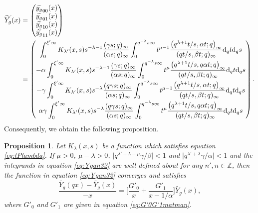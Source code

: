 \documentclass[pdftex]{sigma}
\numberwithin{equation}{section}
\newtheorem{Proposition}[Theorem]{Proposition}
\theoremstyle{definition}
\begin{document}
\begin{align}
 \widetilde{Y_g}(x)
&=\begin{pmatrix}
 \widetilde{y_g}_{00}(x) \\
 \widetilde{y_g}_{01}(x) \\
 \widetilde{y_g}_{10}(x) \\
 \widetilde{y_g}_{11}(x)
 \end{pmatrix}
\nonumber \\
&= \begin{pmatrix}
 \displaystyle \int_0^{\xi' \infty} K_{\lambda'}(x,s) s^{-\lambda -1} \frac{(\gamma s; q)_{\infty}}{(\alpha s; q)_{\infty}} \int_0^{q^{-\lambda } s \infty} t^{\mu -1} \frac{\bigl(q^{\lambda+1}t/s , \alpha t ;q\bigr)_{\infty}}{(qt/s , \beta t ;q)_{\infty}} {\rm d}_q t {\rm d}_q s \vspace{1mm}\\
 \displaystyle - \alpha \int_0^{\xi' \infty} K_{\lambda'}(x,s) s^{-\lambda -1} \frac{(\gamma s; q)_{\infty}}{(\alpha s; q)_{\infty}} \int_0^{q^{-\lambda } s \infty} t^{\mu} \frac{\bigl(q^{\lambda+1}t/s , q \alpha t ;q\bigr)_{\infty}}{(qt/s , \beta t ;q)_{\infty}} {\rm d}_q t {\rm d}_q s \vspace{1mm}\\
 \displaystyle -\gamma \int_0^{\xi' \infty} K_{\lambda'}(x,s) s^{-\lambda } \frac{(q \gamma s; q)_{\infty}}{(\alpha s; q)_{\infty}} \int_0^{q^{-\lambda } s \infty} t^{\mu -1} \frac{\bigl(q^{\lambda+1}t/s , \alpha t ;q\bigr)_{\infty}}{(qt/s , \beta t ;q)_{\infty}} {\rm d}_q t {\rm d}_q s \vspace{1mm}\\
 \displaystyle \alpha \gamma \int_0^{\xi' \infty} K_{\lambda'}(x,s) s^{-\lambda } \frac{(q \gamma s; q)_{\infty}}{(\alpha s; q)_{\infty}} \int_0^{q^{-\lambda } s \infty} t^{\mu} \frac{\bigl(q^{\lambda+1}t/s , q \alpha t ;q\bigr)_{\infty}}{(qt/s , \beta t ;q)_{\infty}} {\rm d}_q t {\rm d}_q s
 \end{pmatrix}.  \label{eq:Ygan32}
\end{align}
Consequently, we obtain the following proposition.
\begin{Proposition}
Let $K_{\lambda }(x,s)$ be a function which satisfies equation \eqref{eq:tPlambda}.
If $\mu >0$, $\mu - \lambda >0 $, $\big|q^{\lambda ' + \lambda -\mu } \gamma / \beta \big| <1 $ and $ \big|q^{\lambda ' +\lambda } \gamma / \alpha \big| <1 $ and the integrands in equation \eqref{eq:Ygan32} are well defined about  for any $n', n \in \mathbb{Z} $, then the function  in equation \eqref{eq:Ygan32} converges and satisfies
\begin{equation} \label{eq:G'0G'1man}
\frac{\widetilde{Y_g}(qx) - \widetilde{Y_g}(x)}{-x} = \bigg[ \frac{G'_0}{x} + \frac{G'_1}{x-1/\alpha} \bigg] \widetilde{Y_g}(x),
\end{equation}
where $G'_0$ and $G'_1$ are given in equation \eqref{eq:G'0G'1matman}.
\end{Proposition}
\end{document}

